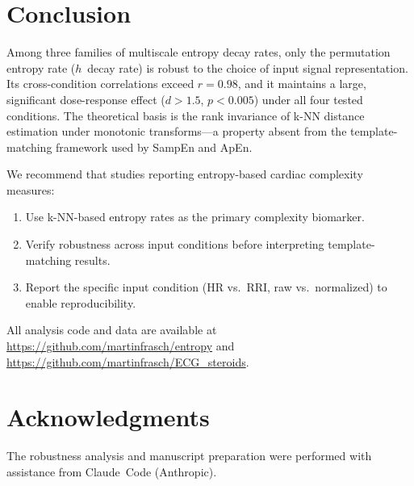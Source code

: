 \documentclass[12pt,a4paper]{article}
\begin{document}
\section{Conclusion}\label{sec:conclusion}

Among three families of multiscale entropy decay rates, only the permutation entropy rate ($h$~decay rate) is robust to the choice of input signal representation.
Its cross-condition correlations exceed $r = 0.98$, and it maintains a large, significant dose-response effect ($d > 1.5$, $p < 0.005$) under all four tested conditions.
The theoretical basis is the rank invariance of k-NN distance estimation under monotonic transforms---a property absent from the template-matching framework used by SampEn and ApEn.

We recommend that studies reporting entropy-based cardiac complexity measures:
\begin{enumerate}
  \item Use k-NN-based entropy rates as the primary complexity biomarker.
  \item Verify robustness across input conditions before interpreting template-matching results.
  \item Report the specific input condition (HR vs.\ RRI, raw vs.\ normalized) to enable reproducibility.
\end{enumerate}

All analysis code and data are available at \url{https://github.com/martinfrasch/entropy} and \url{https://github.com/martinfrasch/ECG_steroids}.


\section*{Acknowledgments}

The robustness analysis and manuscript preparation were performed with assistance from Claude~Code (Anthropic).




\end{document}
